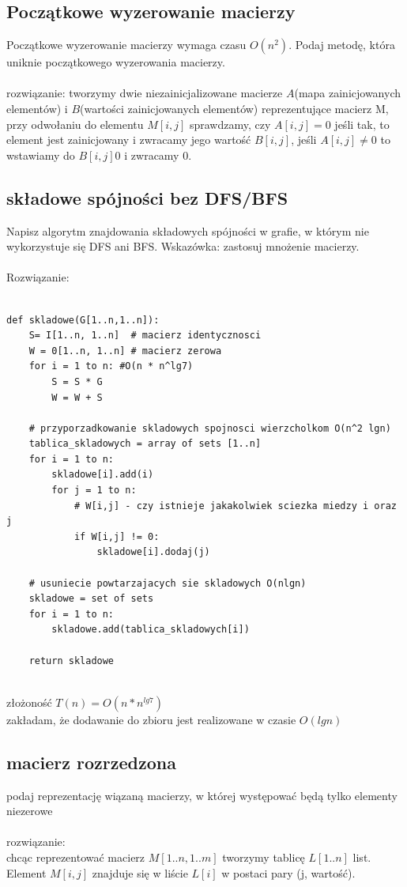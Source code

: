\documentclass{article}
\begin{document}
\subsection*{Początkowe wyzerowanie macierzy}

Początkowe wyzerowanie macierzy wymaga czasu $O(n^2)$.  Podaj metodę, która uniknie początkowego wyzerowania macierzy. \\\\
rozwiązanie:
tworzymy dwie niezainicjalizowane macierze $A$(mapa zainicjowanych elementów) i $B$(wartości zainicjowanych elementów) reprezentujące macierz M,  przy odwołaniu do elementu $M[i,j]$ sprawdzamy, czy $A[i,j] = 0$ jeśli tak, to element jest zainicjowany i zwracamy jego wartość $B[i,j]$, jeśli $A[i,j]\ne0$ to wstawiamy do $B[i,j] 0$ i zwracamy $0$. 


\subsection*{składowe spójności bez DFS/BFS}
Napisz algorytm znajdowania składowych spójności w grafie,  w którym nie wykorzystuje się DFS ani BFS. Wskazówka: zastosuj mnożenie
macierzy. \\\\
Rozwiązanie:\\

\begin{lstlisting}

def skladowe(G[1..n,1..n]):
	S= I[1..n, 1..n]  # macierz identycznosci
	W = 0[1..n, 1..n] # macierz zerowa
	for i = 1 to n: #O(n * n^lg7)
		S = S * G
		W = W + S
	
	# przyporzadkowanie skladowych spojnosci wierzcholkom O(n^2 lgn)
	tablica_skladowych = array of sets [1..n]
	for i = 1 to n:
		skladowe[i].add(i)
		for j = 1 to n:
			# W[i,j] - czy istnieje jakakolwiek sciezka miedzy i oraz j
			if W[i,j] != 0: 
				skladowe[i].dodaj(j)
	
	# usuniecie powtarzajacych sie skladowych O(nlgn)
	skladowe = set of sets
	for i = 1 to n:
		skladowe.add(tablica_skladowych[i])
			
	return skladowe
	
\end{lstlisting}
złożoność $T(n) = O(n * n^{lg7})$ \\
zakładam, że dodawanie do zbioru jest realizowane w czasie $O(lgn)$


\subsection*{macierz rozrzedzona}
podaj reprezentację wiązaną macierzy, w której występować będą tylko elementy niezerowe \\\\
rozwiązanie: \\
chcąc reprezentować macierz $M[1..n, 1..m]$ tworzymy tablicę $L[1..n]$ list.  Element $M[i, j]$ znajduje się w liście $L[i]$ w postaci pary (j, wartość).\\\\
\end{document}
